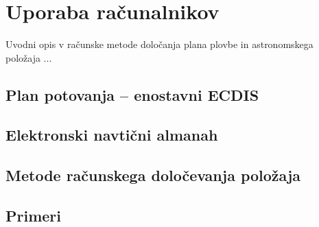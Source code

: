 \chapter{Uporaba računalnikov}

Uvodni opis v računske metode določanja plana plovbe in astronomskega položaja ...

\section{Plan potovanja -- enostavni ECDIS}

\section{Elektronski navtični almanah}

\section{Metode računskega določevanja položaja}

\section{Primeri}
